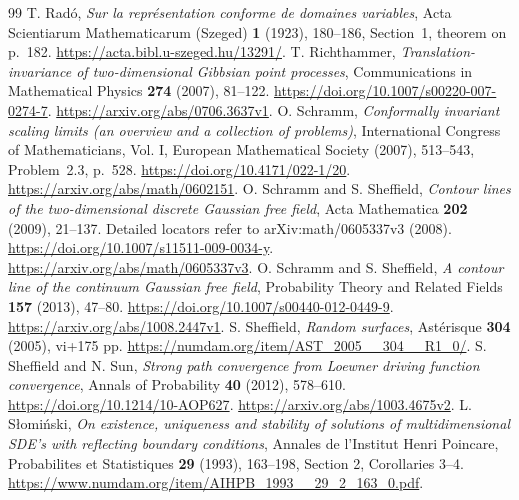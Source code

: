 \documentclass[11pt]{article}
\theoremstyle{definition}
\theoremstyle{remark}
\numberwithin{equation}{section}
\begin{document}
\begin{thebibliography}{99}
 T. Rad\'o,
\emph{Sur la repr\'esentation conforme de domaines variables},
Acta Scientiarum Mathematicarum (Szeged) \textbf{1} (1923), 180--186,
Section~1, theorem on p.~182.
\url{https://acta.bibl.u-szeged.hu/13291/}.
 T. Richthammer,
\emph{Translation-invariance of two-dimensional Gibbsian point processes},
Communications in Mathematical Physics \textbf{274} (2007), 81--122.
\url{https://doi.org/10.1007/s00220-007-0274-7}.
\url{https://arxiv.org/abs/0706.3637v1}.
 O. Schramm,
\emph{Conformally invariant scaling limits (an overview and a collection
of problems)}, International Congress of Mathematicians, Vol. I,
European Mathematical Society (2007), 513--543, Problem~2.3, p.~528.
\url{https://doi.org/10.4171/022-1/20}.
\url{https://arxiv.org/abs/math/0602151}.
 O. Schramm and S. Sheffield,
\emph{Contour lines of the two-dimensional discrete Gaussian free field},
Acta Mathematica \textbf{202} (2009), 21--137.
Detailed locators refer to arXiv:math/0605337v3 (2008).
\url{https://doi.org/10.1007/s11511-009-0034-y}.
\url{https://arxiv.org/abs/math/0605337v3}.
 O. Schramm and S. Sheffield,
\emph{A contour line of the continuum Gaussian free field},
Probability Theory and Related Fields \textbf{157} (2013), 47--80.
\url{https://doi.org/10.1007/s00440-012-0449-9}.
\url{https://arxiv.org/abs/1008.2447v1}.
 S. Sheffield,
\emph{Random surfaces}, Ast\'erisque \textbf{304} (2005), vi+175 pp.
\url{https://numdam.org/item/AST_2005__304__R1_0/}.
 S. Sheffield and N. Sun,
\emph{Strong path convergence from Loewner driving function convergence},
Annals of Probability \textbf{40} (2012), 578--610.
\url{https://doi.org/10.1214/10-AOP627}.
\url{https://arxiv.org/abs/1003.4675v2}.
 L. S\l omi\'nski,
\emph{On existence, uniqueness and stability of solutions of multidimensional
SDE's with reflecting boundary conditions}, Annales de l'Institut Henri
Poincare, Probabilites et Statistiques \textbf{29} (1993), 163--198,
Section 2, Corollaries 3--4.
\url{https://www.numdam.org/item/AIHPB_1993__29_2_163_0.pdf}.
\end{thebibliography}
\end{document}
